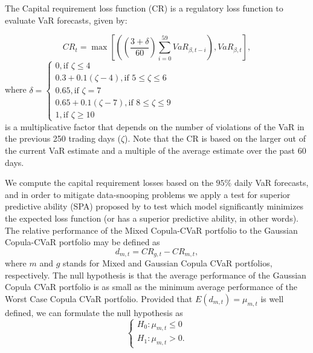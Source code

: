 \documentclass[a4paper,10pt]{article}
\begin{document}
\vspace{0.3cm}

The Capital requirement loss function (CR) is a regulatory loss function to evaluate VaR forecasts, given by:


\begin{equation}CR_{t} =\max \left [\left (\genfrac{(}{)}{}{}{3 +\delta }{60}\sum _{i =0}^{59}VaR_{\beta  ,t -i}\right ) ,VaR_{\beta  ,t}\right ] ,
\end{equation}where $\delta =\left\{ 
\begin{array}{lr}
0,\text{if }\zeta \leq 4 \\ 
0.3+0.1\left( \zeta -4\right) ,\text{if }5\leq \zeta \leq 6 \\ 
0.65,\text{if }\zeta =7 \\ 
0.65+0.1\left( \zeta -7\right) ,\text{if }8\leq \zeta \leq 9 \\ 
1,\text{if }\zeta \geq 10%
\end{array}%
\right. $\\ 

\vspace{0.3cm} \noindent is a multiplicative factor that depends on the number of violations of the VaR in the previous 250 trading days ($\zeta$). Note that the CR is based on the larger out of the
current VaR estimate and a multiple of the average estimate over the past 60
days.


\vspace{0.3cm}

We compute the capital requirement losses based on the $95\%$ daily VaR
forecasts, and in order to mitigate data-snooping problems we apply a test for superior predictive ability (SPA) proposed by \citet*{hansen2005test} to test which model significantly minimizes the expected loss function (or has a superior predictive ability, in other words). The relative performance of the Mixed Copula-CVaR portfolio to the Gaussian Copula-CVaR portfolio may
be defined as 
\[
d_{m,t}=CR_{g,t}-CR_{m,t},
\]%
where $m$ and $g$ stands for Mixed and Gaussian Copula CVaR portfolios, respectively.   The null
hypothesis is that the average performance of the Gaussian Copula CVaR portfolio is as small as the minimum average
performance of the Worst Case Copula CVaR portfolio. 
Provided that $E\left( d_{m,t}\right) =\mu _{m,t}$ is well defined, we can
formulate the null hypothesis as 
\[
\left\{ 
\begin{array}{c}
H_{0}:\mu _{m,t}\leq 0 \\ 
H_{1}:\mu _{m,t}>0.%
\end{array}%
\right. 
\]
\end{document}
